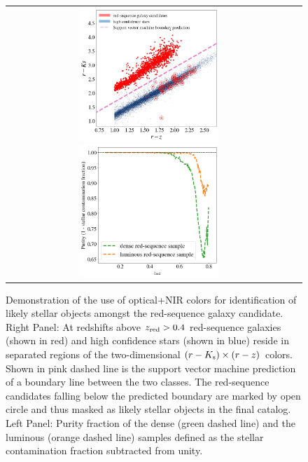 \documentclass[fleqn,usenatbib,useAMS]{mnras}
\begin{document}
\begin{figure}
\begin{tabular}{cc}
\includegraphics[width=0.5\textwidth]{figures_tmp/stars_SVM_lum.png}
\includegraphics[width=0.5\textwidth]{figures_tmp/purity}
\end{tabular}
\caption{\label{fig:star_galaxy_II} Demonstration of the use of optical+NIR colors for identification of likely stellar objects amongst the red-sequence galaxy candidate. Right Panel: At redshifts above $z_{\rm red}>0.4$ red-sequence galaxies (shown in red) and high confidence stars (shown in blue) reside in separated regions of the two-dimensional $(r-K_{\rm s}) \times (r-z)$ colors. Shown in pink dashed line is the support vector machine prediction of a boundary line between the two classes. The red-sequence candidates falling below the predicted boundary are marked by open circle and thus masked as likely stellar objects in the final catalog. Left Panel: Purity fraction of the dense  (green dashed line) and the luminous (orange dashed line) samples defined as the stellar contamination fraction subtracted from unity.} 
\end{figure}
\end{document}
